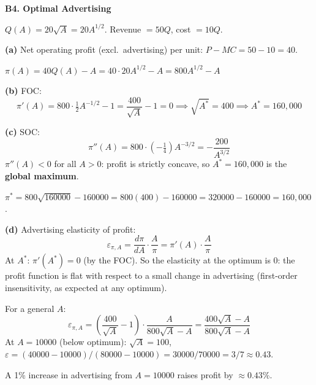 \documentclass[12pt, a4paper]{article}
\theoremstyle{definition}
\begin{document}
\begin{solbox}
\textbf{B4. Optimal Advertising}

$Q(A) = 20\sqrt{A} = 20A^{1/2}$.  Revenue $= 50Q$, cost $= 10Q$.

\textbf{(a)} Net operating profit (excl.\ advertising) per unit:
$P-MC=50-10=40$.

$\pi(A) = 40 Q(A) - A = 40\cdot 20A^{1/2} - A = 800A^{1/2} - A$

\textbf{(b)} FOC:
\[
  \pi'(A) = 800\cdot\tfrac{1}{2}A^{-1/2} - 1 = \frac{400}{\sqrt{A}} - 1 = 0
  \implies \sqrt{A^*} = 400 \implies A^* = 160{,}000
\]

\textbf{(c)} SOC:
\[
  \pi''(A) = 800\cdot(-\tfrac{1}{4})A^{-3/2} = -\frac{200}{A^{3/2}}
\]
$\pi''(A) < 0$ for all $A>0$: profit is strictly concave, so $A^*=160{,}000$
is the \textbf{global maximum}.

$\pi^* = 800\sqrt{160000}-160000 = 800(400)-160000 = 320000-160000=160{,}000$.

\textbf{(d)} Advertising elasticity of profit:
\[
  \varepsilon_{\pi,A} = \frac{d\pi}{dA}\cdot\frac{A}{\pi}
  = \pi'(A)\cdot\frac{A}{\pi}
\]
At $A^*$: $\pi'(A^*)=0$ (by the FOC).  So the elasticity at the optimum is $0$:
the profit function is flat with respect to a small change in advertising
(first-order insensitivity, as expected at any optimum).

For a general $A$:
\[
  \varepsilon_{\pi,A}
  = \left(\frac{400}{\sqrt{A}}-1\right)\cdot\frac{A}{800\sqrt{A}-A}
  = \frac{400\sqrt{A}-A}{800\sqrt{A}-A}
\]
At $A=10000$ (below optimum): $\sqrt{A}=100$,
$\varepsilon = (40000-10000)/(80000-10000)=30000/70000=3/7\approx 0.43$.

A 1\% increase in advertising from $A=10000$ raises profit by $\approx 0.43\%$.
\end{solbox}
\end{document}

